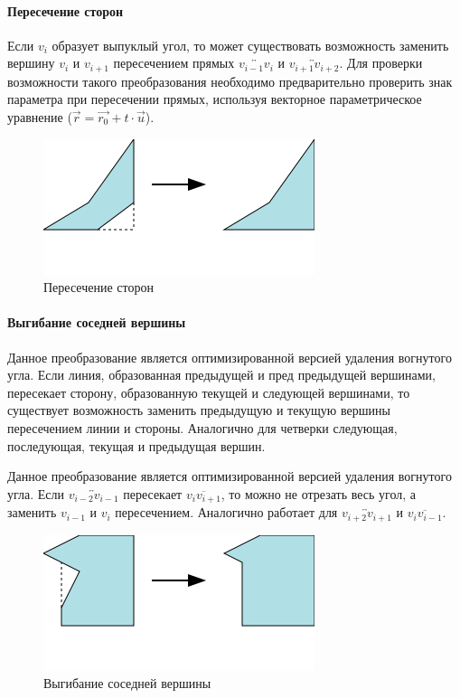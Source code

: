 \documentclass{fefu_thesis/cls/fefu}
\newcommand*\gsegment[1]{\overline{#1}}
\newcommand*\gline[1]{\overleftrightarrow{#1}}
\begin{document}
    \paragraph{Пересечение сторон}
    Если $v_i$ образует выпуклый угол, то может существовать возможность заменить вершину $v_i$ и $v_{i + 1}$ пересечением прямых $\gline{v_{i - 1}v_i}$ и $\gline{v_{i + 1}v_{i + 2}}$. Для проверки возможности такого преобразования необходимо предварительно проверить знак параметра при пересечении прямых, используя векторное параметрическое уравнение ($\vec{r} = \vec{r_0} + t \cdot \vec{u}$).

    \begin{figure}[H]
        \centering
        \includegraphics[scale=1]{images/bendneighbor2.png}
        \caption{Пересечение сторон}
    \end{figure}

    \paragraph{Выгибание соседней вершины}
    Данное преобразование является оптимизированной версией удаления вогнутого угла. Если линия, образованная предыдущей и пред предыдущей вершинами, пересекает сторону, образованную текущей и следующей вершинами, то существует возможность заменить предыдущую и текущую вершины пересечением линии и стороны. Аналогично для четверки следующая, последующая, текущая и предыдущая вершин.

    Данное преобразование является оптимизированной версией удаления вогнутого угла. Если $\gline{v_{i - 2}v_{i - 1}}$ пересекает $\gsegment{v_iv_{i + 1}}$, то можно не отрезать весь угол, а заменить $v_{i - 1}$ и $v_{i}$ пересечением. Аналогично работает для $\gline{v_{i + 2}v_{i + 1}}$ и $\gsegment{v_iv_{i - 1}}$.

    \begin{figure}[H]
        \centering
        \includegraphics[scale=1]{images/bendneighbor.png}
        \caption{Выгибание соседней вершины}
    \end{figure}
\end{document}
